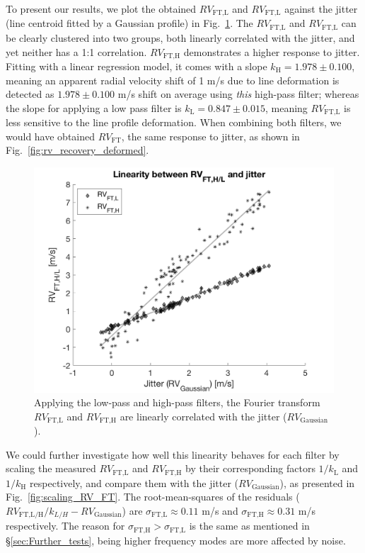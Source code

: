 To present our results, we plot the obtained $RV_\text{FT,L}$ and $RV_\text{FT,L}$ against the jitter (line centroid fitted by a Gaussian profile) in Fig.~\ref{fig:FT_vs_Gaussian}. The $RV_\text{FT,L}$ and $RV_\text{FT,L}$ can be clearly clustered into two groups, both linearly correlated with the jitter, and yet neither has a 1:1 correlation. $RV_\text{FT,H}$ demonstrates a higher response to jitter. Fitting with a linear regression model, it comes with a slope $k_\text{H} = 1.978\pm0.100$, meaning an apparent radial velocity shift of 1 m/s due to line deformation is detected as $1.978\pm0.100$ m/s shift on average using \textit{this} high-pass filter; whereas the slope for applying a low pass filter is $k_\text{L} = 0.847\pm0.015$, meaning $RV_\text{FT,L}$ is less sensitive to the line profile deformation. When combining both filters, we would have obtained $RV_\text{FT}$, the same response to jitter, as shown in Fig.~\ref{fig:rv_recovery_deformed}.

\begin{figure}[tbp]
\centering
\includegraphics[width = 0.7 \linewidth]
{./Figures/Methods/5-JITTER_ONLY_1.png}
\caption[Fourier transform in response to line deformation]
{Applying the low-pass and high-pass filters, the Fourier transform $RV_\text{FT,L}$ and $RV_\text{FT,H}$ are linearly correlated with the jitter ($RV_\text{Gaussian}$).}
\label{fig:FT_vs_Gaussian}
\end{figure} 

We could further investigate how well this linearity behaves for each filter by scaling the measured $RV_\text{FT,L}$ and $RV_\text{FT,H}$ by their corresponding factors $1/k_\text{L}$ and $1/k_\text{H}$ respectively, and compare them with the jitter ($RV_\text{Gaussian}$), as presented in Fig.~\ref{fig:scaling_RV_FT}. The root-mean-squares of the residuals ($RV_\text{FT,L/H}/k_{L/H} - RV_\text{Gaussian}$) are $\sigma_\text{FT,L} \approx 0.11$ m/s and $\sigma_\text{FT,H} \approx 0.31$ m/s respectively. The reason for $\sigma_\text{FT,H}>\sigma_\text{FT,L}$ is the same as mentioned in \S\ref{sec:Further_tests}, being higher frequency modes are more affected by noise. 

